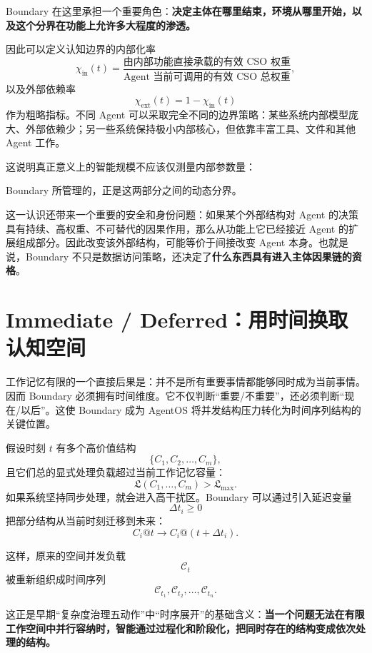 Boundary 在这里承担一个重要角色：\textbf{决定主体在哪里结束，环境从哪里开始，以及这个分界在功能上允许多大程度的渗透。}

因此可以定义认知边界的内部化率
\[
\chi_{\mathrm{in}}(t)
=
\frac{
\text{由内部功能直接承载的有效 CSO 权重}
}{
\text{Agent 当前可调用的有效 CSO 总权重}
},
\]
以及外部依赖率
\[
\chi_{\mathrm{ext}}(t)
=
1-\chi_{\mathrm{in}}(t)
\]
作为粗略指标。不同 Agent 可以采取完全不同的边界策略：某些系统内部模型庞大、外部依赖少；另一些系统保持极小内部核心，但依靠丰富工具、文件和其他 Agent 工作。

这说明真正意义上的智能规模不应该仅测量内部参数量：
\begin{statementbox}
\centering
{}
\end{statementbox}

Boundary 所管理的，正是这两部分之间的动态分界。

这一认识还带来一个重要的安全和身份问题：如果某个外部结构对 Agent 的决策具有持续、高权重、不可替代的因果作用，那么从功能上它已经接近 Agent 的扩展组成部分。因此改变该外部结构，可能等价于间接改变 Agent 本身。也就是说，Boundary 不只是数据访问策略，还决定了\textbf{什么东西具有进入主体因果链的资格}。


\section{Immediate / Deferred：用时间换取认知空间}

工作记忆有限的一个直接后果是：并不是所有重要事情都能够同时成为当前事情。因而 Boundary 必须拥有时间维度。它不仅判断“重要/不重要”，还必须判断“现在/以后”。这使 Boundary 成为 AgentOS 将并发结构压力转化为时间序列结构的关键位置。

假设时刻 $t$ 有多个高价值结构
\[
\{C_1,C_2,\ldots,C_m\},
\]
且它们总的显式处理负载超过当前工作记忆容量：
\[
\mathfrak{L}
\left(
C_1,\ldots,C_m
\right)
>
\mathfrak{L}_{\max}.
\]
如果系统坚持同步处理，就会进入高干扰区。Boundary 可以通过引入延迟变量
\[
\Delta t_i
\geq0
\]
把部分结构从当前时刻迁移到未来：
\[
C_i@t
\longrightarrow
C_i@(t+\Delta t_i).
\]

这样，原来的空间并发负载
\[
\mathcal{C}_t
\]
被重新组织成时间序列
\[
\mathcal{C}_{t_1},
\mathcal{C}_{t_2},
\ldots,
\mathcal{C}_{t_n}.
\]

这正是早期“复杂度治理五动作”中“时序展开”的基础含义：\textbf{当一个问题无法在有限工作空间中并行容纳时，智能通过过程化和阶段化，把同时存在的结构变成依次处理的结构。}


